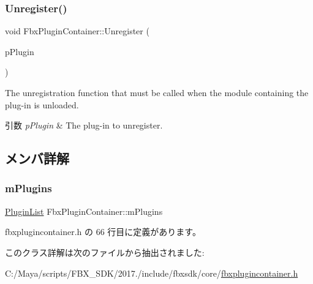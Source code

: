 \subsubsection{\texorpdfstring{Unregister()}{Unregister()}}
{\footnotesize\ttfamily void Fbx\+Plugin\+Container\+::\+Unregister (\begin{DoxyParamCaption}\item[{\hyperlink{class_fbx_plugin}{Fbx\+Plugin} \&}]{p\+Plugin }\end{DoxyParamCaption})}

The unregistration function that must be called when the module containing the plug-\/in is unloaded. 
\begin{DoxyParams}{引数}
{\em p\+Plugin} & The plug-\/in to unregister. \\
\hline
\end{DoxyParams}


\subsection{メンバ詳解}
\mbox{\label{class_fbx_plugin_container_a89a3739ecdf85a1eaeb72ad8bd8a0587}} 
\subsubsection{\texorpdfstring{m\+Plugins}{mPlugins}}
{\footnotesize\ttfamily \hyperlink{class_fbx_plugin_container_a42abd8471efa91f56de2c4c64c220972}{Plugin\+List} Fbx\+Plugin\+Container\+::m\+Plugins\hspace{0.3cm}{\ttfamily [protected]}}



 fbxplugincontainer.\+h の 66 行目に定義があります。



このクラス詳解は次のファイルから抽出されました\+:\begin{DoxyCompactItemize}
\item 
C\+:/\+Maya/scripts/\+F\+B\+X\+\_\+\+S\+D\+K/2017./include/fbxsdk/core/\hyperlink{fbxplugincontainer_8h}{fbxplugincontainer.\+h}\end{DoxyCompactItemize}
